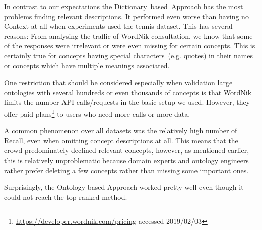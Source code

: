 In contrast to our expectations the Dictionary~based~Approach has the most problems finding relevant descriptions. It performed even worse than having no Context at all when experiments used the tennis dataset. This has several reasons: From analysing the traffic of WordNik consultation, we know that some of the responses were irrelevant or were even missing for certain concepts. This is certainly true for concepts having special characters~(e.g. quotes) in their names or concepts which have multiple meanings associated. 

One restriction that should be considered especially when validation large ontologies with several hundreds or even thousands of concepts is that WordNik limits the number API calls/requests in the basic setup we used. However, they offer paid plans\footnote{\url{https://developer.wordnik.com/pricing} accessed 2019/02/03} to users who need more calls or more data.

A common phenomenon over all datasets was the relatively high number of Recall, even when omitting concept descriptions at all. This means that the crowd predominately declined relevant concepts, however, as mentioned earlier, this is relatively unproblematic because domain experts and ontology engineers rather prefer deleting a few concepts rather than missing some important ones. 

Surprisingly, the Ontology based Approach worked pretty well even though it could not reach the top ranked method. 

